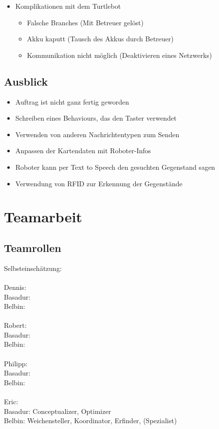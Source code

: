 \documentclass[a4paper,12pt,headsepline,toc=flat]{scrartcl}
\begin{document}
\begin{itemize}
			\item Komplikationen mit dem Turtlebot
			\begin{itemize}
				\item Falsche Branches (Mit Betreuer gelöst)
				\item Akku kaputt (Tausch des Akkus durch Betreuer)
				\item Kommunikation nicht möglich (Deaktivieren eines Netzwerks)
			\end{itemize}
		\end{itemize}
	
	\subsection{Ausblick}
	\begin{itemize}
		\item Auftrag ist nicht ganz fertig geworden
		\item Schreiben eines Behaviours, das den Taster verwendet
		\item Verwenden von anderen Nachrichtentypen zum Senden
		\item Anpassen der Kartendaten mit Roboter-Infos
		\item Roboter kann per Text to Speech den gesuchten Gegenstand sagen
		\item Verwendung von RFID zur Erkennung der Gegenstände
	\end{itemize}
	\newpage
	\section{Teamarbeit}
	
	\subsection{Teamrollen}
		Selbsteinschätzung:\\\\
		Dennis:\\
		Basadur: \\
		Belbin: \\\\
		Robert:\\
		Basadur: \\
		Belbin: \\\\
		Philipp:\\
		Basadur: \\
		Belbin: \\\\
		Eric:\\
		Basadur: Conceptualizer, Optimizer\\
		Belbin: Weichensteller, Koordinator, Erfinder, (Spezialist)\\
\end{document}
